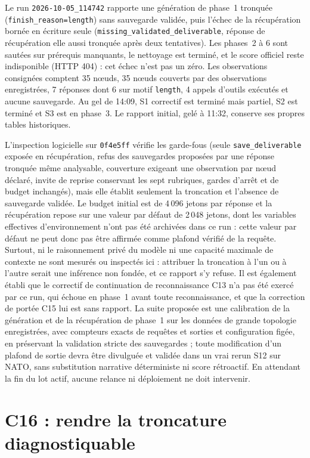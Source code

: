 \documentclass[11pt,a4paper]{article}
\newcommand{\code}[1]{{\urlstyle{tt}\nolinkurl{#1}}}
\begin{document}
Le run \code{2026-10-05_114742} rapporte une génération de phase~1 tronquée (\code{finish_reason=length}) sans sauvegarde validée, puis l'échec de la récupération bornée en écriture seule (\code{missing_validated_deliverable}, réponse de récupération elle aussi tronquée après deux tentatives). Les phases~2 à 6 sont sautées sur prérequis manquants, le nettoyage est terminé, et le score officiel reste indisponible (HTTP 404) : cet échec n'est pas un zéro. Les observations consignées comptent 35 n\oe{}uds, 35 n\oe{}uds couverts par des observations enregistrées, 7 réponses dont 6 sur motif \code{length}, 4 appels d'outils exécutés et aucune sauvegarde. Au gel de 14:09, S1 correctif est terminé mais partiel, S2 est terminé et S3 est en phase~3. Le rapport initial, gelé à 11:32, conserve ses propres tables historiques.

L'inspection logicielle sur \code{0f4e5ff} vérifie les garde-fous (seule \code{save_deliverable} exposée en récupération, refus des sauvegardes proposées par une réponse tronquée même analysable, couverture exigeant une observation par n\oe{}ud déclaré, invite de reprise conservant les sept rubriques, gardes d'arrêt et de budget inchangés), mais elle établit seulement la troncation et l'absence de sauvegarde validée. Le budget initial est de 4\,096 jetons par réponse et la récupération repose sur une valeur par défaut de 2\,048 jetons, dont les variables effectives d'environnement n'ont pas été archivées dans ce run : cette valeur par défaut ne peut donc pas être affirmée comme plafond vérifié de la requête. Surtout, ni le raisonnement privé du modèle ni une capacité maximale de contexte ne sont mesurés ou inspectés ici : attribuer la troncation à l'un ou à l'autre serait une inférence non fondée, et ce rapport s'y refuse. Il est également établi que le correctif de continuation de reconnaissance C13 n'a pas été exercé par ce run, qui échoue en phase~1 avant toute reconnaissance, et que la correction de portée C15 lui est sans rapport. La suite proposée est une calibration de la génération et de la récupération de phase~1 sur les données de grande topologie enregistrées, avec compteurs exacts de requêtes et sorties et configuration figée, en préservant la validation stricte des sauvegardes ; toute modification d'un plafond de sortie devra être divulguée et validée dans un vrai rerun S12 sur NATO, sans substitution narrative déterministe ni score rétroactif. En attendant la fin du lot actif, aucune relance ni déploiement ne doit intervenir.

\section{C16 : rendre la troncature diagnostiquable}
\label{sec:c16}
\end{document}

